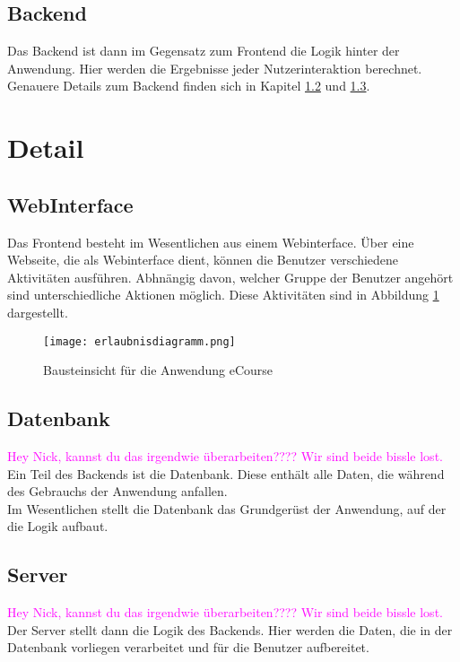 \subsection{Backend}
Das \gls{Backend} ist dann im Gegensatz zum \gls{Frontend} die Logik hinter der Anwendung. Hier werden die Ergebnisse jeder Nutzerinteraktion berechnet. Genauere Details zum \gls{Backend} finden sich in Kapitel \ref{sec:Datenbank} und \ref{sec:Server}.

\section{Detail}

\subsection{WebInterface}
Das \gls{Frontend} besteht im Wesentlichen aus einem \gls{Webinterface}. Über eine Webseite, die als \gls{Webinterface} dient, können die Benutzer verschiedene Aktivitäten ausführen. Abhnängig davon, welcher Gruppe der Benutzer angehört sind unterschiedliche Aktionen möglich. 
Diese Aktivitäten sind in Abbildung \ref{fib:erlaubnis} dargestellt.

\begin{figure}[H]
\centering
\texttt{[image: erlaubnisdiagramm.png]}
\caption{Bausteinsicht für die Anwendung eCourse}
\label{fib:erlaubnis}
\end{figure}

\subsection{Datenbank}
\label{sec:Datenbank}

\textcolor{magenta}{Hey Nick, kannst du das irgendwie überarbeiten???? Wir sind beide bissle lost.}
Ein Teil des \gls{Backend}s ist die Datenbank. Diese enthält alle Daten, die während des Gebrauchs der Anwendung anfallen. \\
Im Wesentlichen stellt die Datenbank das Grundgerüst der Anwendung, auf der die Logik aufbaut.


\subsection{Server}
\label{sec:Server}
\textcolor{magenta}{Hey Nick, kannst du das irgendwie überarbeiten???? Wir sind beide bissle lost.}
Der Server stellt dann die Logik des \gls{Backend}s. Hier werden die Daten, die in der Datenbank vorliegen verarbeitet und für die Benutzer aufbereitet. 